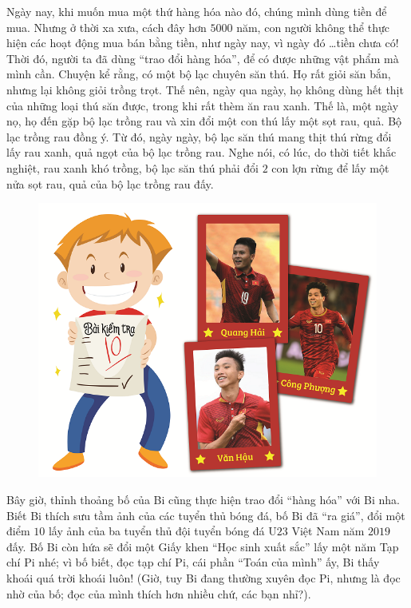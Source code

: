 	Ngày nay, khi muốn mua một thứ hàng hóa nào đó, chúng mình dùng tiền để mua. Nhưng ở thời xa xưa, cách đây hơn $5000$ năm, con người không thể thực hiện các hoạt động mua bán bằng tiền, như ngày nay, vì ngày đó \ldots tiền chưa có! Thời đó, người ta đã dùng “trao đổi hàng hóa”, để có được những vật phẩm mà mình cần. Chuyện kể rằng, có một bộ lạc chuyên săn thú. Họ rất giỏi săn bắn, nhưng lại không giỏi trồng trọt. Thế nên, ngày qua ngày, họ không dùng hết thịt của những loại thú săn được, trong khi rất thèm ăn rau xanh. Thế là, một ngày nọ, họ đến gặp bộ lạc trồng rau và xin đổi một con thú lấy một sọt rau, quả. Bộ lạc trồng rau đồng ý. Từ đó, ngày ngày, bộ lạc săn thú mang thịt thú
	rừng đổi lấy rau xanh, quả ngọt của bộ lạc trồng rau. Nghe nói, có lúc, do thời tiết khắc nghiệt, rau xanh khó trồng, bộ lạc săn thú phải đổi $2$ con lợn rừng để lấy một nửa sọt rau, quả của bộ lạc trồng rau đấy.
	\vskip 0.01cm
	\begin{figure}
		\centering
		\vspace*{-20pt}
		\captionsetup{labelformat= empty, justification=centering}
		\includegraphics[width=1\linewidth]{pic3}
		\vspace*{-25pt}
	\end{figure}	
	Bây giờ, thỉnh thoảng bố của Bi cũng thực hiện trao đổi “hàng hóa” với Bi nha. Biết Bi thích sưu tầm ảnh của các tuyển thủ bóng đá, bố Bi đã “ra giá”, đổi một điểm $10$ lấy ảnh của ba tuyển thủ đội tuyển bóng đá U$23$ Việt Nam năm $2019$ đấy. Bố Bi còn hứa sẽ đổi một Giấy khen “Học sinh xuất sắc” lấy một năm Tạp chí Pi nhé; vì bố biết, đọc tạp chí Pi, cái phần “Toán của  mình” ấy, Bi thấy khoái quá trời khoái luôn! (Giờ, tuy Bi đang thường xuyên đọc Pi, nhưng là đọc nhờ của bố; đọc của mình thích hơn nhiều chứ, các bạn nhỉ?).
